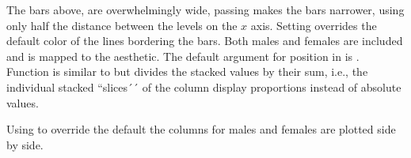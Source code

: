 \documentclass[krantz2]{krantz}\usepackage{knitr}
\begin{document}
The \label{par:plot:pos:stack} bars above, are overwhelmingly wide, passing  makes the bars narrower, using only half the distance between the levels on the $x$ axis. Setting  overrides the default color of the lines bordering the bars. Both males and females are included and  is mapped to the  aesthetic. The default argument for position in  is . Function  is similar to  but divides the stacked values by their sum, i.e., the individual stacked ``slices´´ of the column display proportions instead of absolute values.



\begin{knitrout}\footnotesize
{}\color{fgcolor}\begin{kframe}
\begin{alltt}
 \hlkwb{<-}
         \hlstd{=} \hlstd{(}     
\end{alltt}
\end{kframe}
\end{knitrout}

\begin{knitrout}\footnotesize
{}\color{fgcolor}\begin{kframe}
\begin{alltt}
 \hlkwb{<-}  \hlopt{+} \hlstd{(} \hlstd{=} \hlstd{)} \hlopt{+} \hlstd{(}\hlstd{)}
\end{alltt}
\end{kframe}
\end{knitrout}

Using \label{par:plot:pos:dodge} to override the default  the columns for males and females are plotted side by side.

\begin{knitrout}\footnotesize
{}\color{fgcolor}\begin{kframe}
\begin{alltt}
 \hlkwb{<-}  \hlopt{+} \hlstd{(} \hlstd{=} \hlstd{)} \hlopt{+} \hlstd{(}\hlstd{)}
\end{alltt}
\end{kframe}
\end{knitrout}
\end{document}
